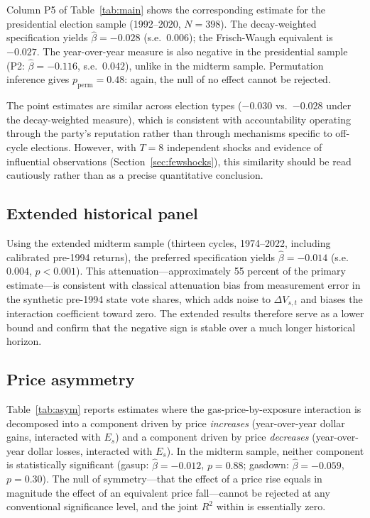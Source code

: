 \documentclass[12pt]{article}
\begin{document}
Column P5 of Table~\ref{tab:main} shows the corresponding estimate for the presidential election sample (1992--2020, $N=398$). The decay-weighted specification yields $\hat\beta=-0.028$ (s.e.\ $0.006$); the Frisch-Waugh equivalent is $-0.027$. The year-over-year measure is also negative in the presidential sample (P2: $\hat\beta=-0.116$, s.e.\ $0.042$), unlike in the midterm sample. Permutation inference gives $p_{\text{perm}}=0.48$: again, the null of no effect cannot be rejected.

The point estimates are similar across election types ($-0.030$ vs.\ $-0.028$ under the decay-weighted measure), which is consistent with accountability operating through the party's reputation rather than through mechanisms specific to off-cycle elections. However, with $T=8$ independent shocks and evidence of influential observations (Section~\ref{sec:fewshocks}), this similarity should be read cautiously rather than as a precise quantitative conclusion.

\subsection{Extended historical panel}

Using the extended midterm sample (thirteen cycles, 1974--2022, including calibrated pre-1994 returns), the preferred specification yields $\hat\beta=-0.014$ (s.e.\ $0.004$, $p<0.001$). This attenuation---approximately 55 percent of the primary estimate---is consistent with classical attenuation bias from measurement error in the synthetic pre-1994 state vote shares, which adds noise to $\Delta V_{s,t}$ and biases the interaction coefficient toward zero. The extended results therefore serve as a lower bound and confirm that the negative sign is stable over a much longer historical horizon.

\subsection{Price asymmetry}

Table~\ref{tab:asym} reports estimates where the gas-price-by-exposure interaction is decomposed into a component driven by price \textit{increases} (year-over-year dollar gains, interacted with $E_s$) and a component driven by price \textit{decreases} (year-over-year dollar losses, interacted with $E_s$). In the midterm sample, neither component is statistically significant (gasup: $\hat\beta=-0.012$, $p=0.88$; gasdown: $\hat\beta=-0.059$, $p=0.30$). The null of symmetry---that the effect of a price rise equals in magnitude the effect of an equivalent price fall---cannot be rejected at any conventional significance level, and the joint $R^2$ within is essentially zero.
\end{document}
